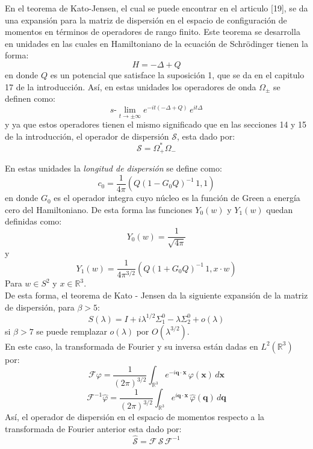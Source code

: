 \documentclass[12pt]{book}
\numberwithin{equation}{chapter}
\def\q{\mathbf{q}}
\def\R{\mathbb{R}}
\def\S{\mathcal{S}}
\def\rar{\rightarrow}
\def\F{\mathcal{F}}
\def\x{\mathbf{x}}
\def\O{\Omega}
\def\slim{s\mbox{-}\lim}
\begin{document}
En el teorema de Kato-Jensen, el cual se puede encontrar en el articulo [19], se da una expansi\'on para la matriz de dispersi\'on en el espacio de configuraci\'on de momentos en t\'erminos de operadores de rango finito. Este teorema se desarrolla en unidades en las cuales en Hamiltoniano de la ecuaci\'on de Schr\"odinger tienen la forma:
$$ H=- \Delta + Q $$ 
en donde $Q$ es un potencial que satisface la suposici\'on 1, que se da en el capitulo 17 de la introducci\'on. As\'i, en estas unidades los operadores de onda $\O_{\pm}$ se definen como:
$$ \slim_{t \rar \pm \infty} e^{-it( -\Delta +Q )} \, e^{it\Delta} $$
y ya que estos operadores tienen el mismo significado que en las secciones 14 y 15 de la introducci\'on, el operador de dispersi\'on $\S$, esta dado por:
$$ \S= \O_{+}^{*} \O_{-} $$

En estas unidades la \emph{longitud de dispersi\'on} se define como:
\begin{equation}%
c_{0}= \frac{1}{4 \pi} \left( Q ( 1-G_{0} Q)^{-1}\, 1 ,1 \right)
\end{equation}
en donde $G_{0}$ es el operador integra cuyo n\'ucleo es la funci\'on de Green a energ\'ia cero del Hamiltoniano. De esta forma las funciones $Y_{0}(w)$ y $Y_{1}(w)$ quedan definidas como:
$$ Y_{0}(w)= \frac{1}{\sqrt{4 \pi}} $$
y 
\begin{equation}\label{Y1}
Y_{1}(w)= \frac{1}{4\pi^{3/2}} \left( Q ( 1+G_{0}Q )^{-1}\, 1, x \cdot w  \right)
\end{equation}
Para $w \in S^{2}$ y $x\in \R^{3}$.\\
De esta forma, el teorema de Kato - Jensen da la siguiente expansi\'on de la matriz de dispersi\'on, para $\beta >5$:
\begin{equation}\label{S-lamb}
S(\lambda) = I + i \lambda^{1/2}\Sigma_{1}^{0} - \lambda \Sigma_{2}^{0} + o(\lambda)
\end{equation}
si $\beta >7$ se puede remplazar $o(\lambda)$ por $O(\lambda^{3/2})$.\\

En este caso, la transformada de Fourier y su inversa est\'an dadas en $L^{2}(\R^{3})$ por:
$$ \F \varphi= \frac{1}{(2\pi)^{3/2}} \int_{\R^{3}} e^{-i \q \cdot \x}\, \varphi(\x) \, d\x $$
$$ \F^{-1} \hat{\varphi}= \frac{1}{(2\pi)^{3/2}} \int_{\R^{3}} e^{i \q \cdot \x}\, \hat{\varphi}(\q) \, d\q $$
As\'i, el operador de dispersi\'on en el espacio de momentos respecto a la transformada de Fourier anterior esta dado por:
\begin{equation}\label{S-hat}
\hat{\S}=\F \, \S \, \F^{-1}
\end{equation}
\end{document}
